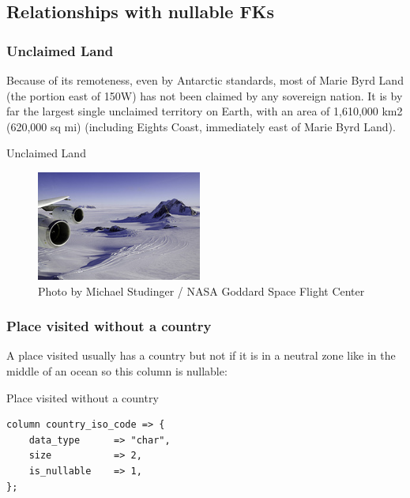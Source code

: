 \subsection{Relationships with nullable FKs}


\subsubsection{Unclaimed Land}

Because of its remoteness, even by Antarctic standards, most of Marie Byrd
Land (the portion east of 150\degree{}W) has not been claimed by any sovereign
nation. It is by far the largest single unclaimed territory on Earth, with
an area of 1,610,000 km2 (620,000 sq mi) (including Eights Coast,
immediately east of Marie Byrd Land).

\begin{frame}{Unclaimed Land}
  \begin{figure}[!ht]
    \begin{center}
\includegraphics{img/Marie_Byrd_Land.jpg}
\caption[Marie Byrd Land]{Photo by Michael Studinger / NASA
  Goddard Space Flight Center}
    \end{center}
\end{figure}
\end{frame}

\subsubsection{Place visited without a country}

A place visited usually has a country but not if it is in a neutral zone like in
the middle of an ocean so this column is nullable:

\begin{frame}[fragile]{Place visited without a country}
\begin{lstlisting}
column country_iso_code => {
    data_type      => "char",
    size           => 2,
    is_nullable    => 1,
};
\end{lstlisting}
\end{frame}

